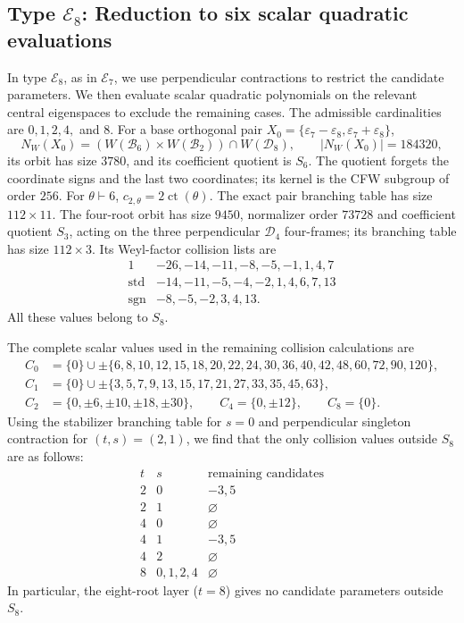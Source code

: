 \documentclass[11pt,a4paper]{amsart}
\theoremstyle{uprightdefinition}
\theoremstyle{remark}\newtheorem{remark}[theorem]{Remark}
\begin{document}
\subsection{Type \texorpdfstring{$\mathscr{E}_8$}{E8}: Reduction to six scalar quadratic evaluations}
In type $\mathscr{E}_8$, as in $\mathscr{E}_7$, we use perpendicular contractions to restrict the candidate parameters.
We then evaluate scalar quadratic polynomials on the relevant central eigenspaces to exclude the remaining cases.
The admissible cardinalities are $0,1,2,4,$ and $8$.
For a base orthogonal pair
$X_0=\{\varepsilon_7-\varepsilon_8,\varepsilon_7+\varepsilon_8\}$,
\[
 N_W(X_0)=(W(\mathscr{B}_6)\times W(\mathscr{B}_2))\cap W(\mathscr{D}_8),\qquad
 |N_W(X_0)|=184320,
\]
its orbit has size $3780$, and its coefficient quotient is $S_6$.
The quotient forgets the coordinate signs and the last two coordinates;
its kernel is the CFW subgroup of order $256$.
For $\theta\vdash6$,
$c_{2,\theta}=2\operatorname{ct}(\theta)$.
The exact pair branching table has size $112\times11$.
The four-root orbit has size $9450$, normalizer order $73728$ and
coefficient quotient $S_3$, acting on the three perpendicular $\mathscr{D}_4$
four-frames; its branching table has size $112\times3$.
Its Weyl-factor collision lists are
\[
\begin{array}{c|l}
1&-26,-14,-11,-8,-5,-1,1,4,7\\
\mathrm{std}&-14,-11,-5,-4,-2,1,4,6,7,13\\
\mathrm{sgn}&-8,-5,-2,3,4,13.
\end{array}
\]
All these values belong to $S_8$.

The complete scalar values used in the remaining collision calculations are
\begin{align*}
 C_0&=\{0\}\cup\pm\{6,8,10,12,15,18,20,22,24,30,36,40,42,48,60,72,90,120\},\\
 C_1&=\{0\}\cup\pm\{3,5,7,9,13,15,17,21,27,33,35,45,63\},\\
 C_2&=\{0,\pm6,\pm10,\pm18,\pm30\},\qquad
 C_4=\{0,\pm12\},\qquad C_8=\{0\}.
\end{align*}
Using the stabilizer branching table for $s=0$ and perpendicular
singleton contraction for $(t,s)=(2,1)$, we find that the only collision values outside $S_8$ are as follows:
\[
\begin{array}{c|c|c}
 t&s&\text{remaining candidates}\\\hline
 2&0&-3,5\\
 2&1&\varnothing\\
 4&0&\varnothing\\
 4&1&-3,5\\
 4&2&\varnothing\\
 8&0,1,2,4&\varnothing
\end{array}
\]
In particular, the eight-root layer ($t=8$) gives no candidate parameters outside $S_8$.
\end{document}
